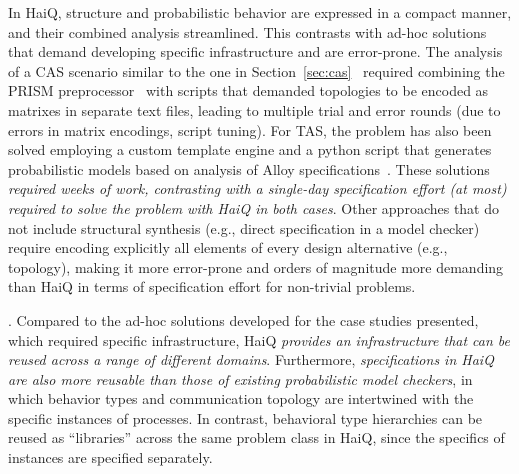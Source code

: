 \documentclass[10pt,journal,compsoc]{IEEEtran}
\begin{document}
\smallskip 
{} In {\sf HaiQ}, structure and probabilistic behavior are expressed in a compact manner, and their combined analysis streamlined.
This contrasts with ad-hoc solutions that demand developing specific infrastructure and are error-prone. The analysis of a CAS scenario similar to the one in Section~\ref{sec:cas}~\cite{caspub} required combining the PRISM preprocessor~\cite{prismpp} with scripts that demanded topologies to be encoded as matrixes in separate text files, leading to multiple trial and error rounds (due to errors in matrix encodings, script tuning). 
For TAS, the problem has also been solved employing a custom template engine and a python script that generates probabilistic models based on analysis of Alloy specifications~\cite{taspub}. 
These solutions {\it required weeks of work, contrasting with a single-day specification effort (at most) required to solve the problem with {\sf HaiQ} in both cases}. 
Other approaches that do not include structural synthesis (e.g., direct specification in a model checker) require encoding explicitly all elements of every design alternative (e.g., topology), making it more error-prone and orders of magnitude more demanding than {\sf HaiQ} in terms of specification effort for non-trivial problems. 

\smallskip
{}. Compared to the ad-hoc solutions developed for the case studies presented, which required specific infrastructure, {\sf HaiQ} {\it provides an infrastructure that can be reused across a range of different domains}. 
Furthermore, {\it specifications in {\sf HaiQ} are also more reusable than those of existing probabilistic model checkers}, in which behavior types and communication topology are intertwined with the specific instances of processes. In contrast, behavioral type hierarchies can be reused as ``libraries'' across the same problem class in {\sf HaiQ}, since the specifics of instances are specified separately. 
\end{document}
